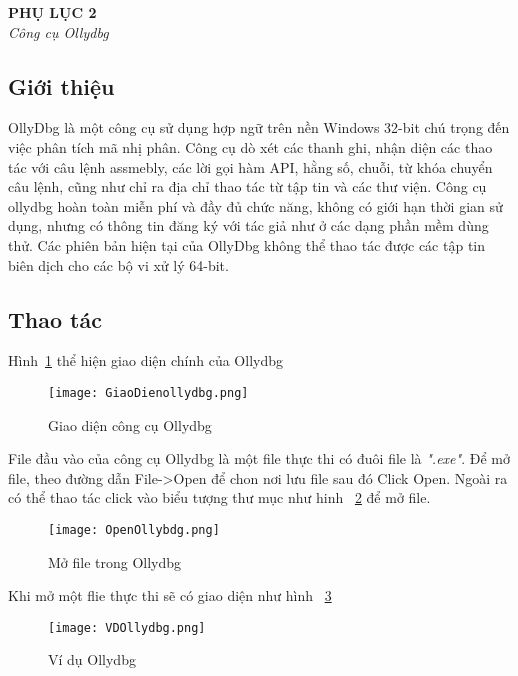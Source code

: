 \begin{center}
	\begin{huge}
			\textbf{PHỤ LỤC 2}\\
			\textit{Công cụ Ollydbg}
	\end{huge}
\end{center}

\subsection*{Giới thiệu}
	OllyDbg là một công cụ sử dụng hợp ngữ trên nền Windows 32-bit chú trọng đến việc phân tích mã nhị phân. Công cụ dò xét các thanh ghi, nhận diện các thao tác với câu lệnh assmebly, các lời gọi hàm API, hằng số, chuỗi, từ khóa chuyển câu lệnh, cũng như chỉ ra địa chỉ thao tác từ tập tin và các thư viện. Công cụ ollydbg hoàn toàn miễn phí và đầy đủ chức năng, không có giới hạn thời gian sử dụng, nhưng có thông tin đăng ký với tác giả như ở các dạng phần mềm dùng thử. Các phiên bản hiện tại của OllyDbg không thể thao tác được các tập tin biên dịch cho các bộ vi xử lý 64-bit.
\subsection*{Thao tác}
Hình~\ref{fig:GiaoDienOllydbg} thể hiện giao diện chính của Ollydbg
	\begin{center}
			\begin{figure}[htp]
				\begin{center}
					\texttt{[image: GiaoDienollydbg.png]}
				\end{center}
				\caption{Giao diện công cụ Ollydbg}	
					\label{fig:GiaoDienOllydbg}		
			\end{figure}
		\end{center}		

File đầu vào của công cụ Ollydbg là một file thực thi có đuôi file là \textit{".exe"}. Để mở file, theo đường dẫn File->Open để chon nơi lưu file sau đó Click Open. Ngoài ra có thể thao tác click vào biểu tượng thư mục như hinh ~\ref{fig:OpenOllydbg} để mở file.
		\begin{center}
			\begin{figure}[htp]
				\begin{center}
					\texttt{[image: OpenOllybdg.png]}
				\end{center}
				\caption{Mở file trong Ollydbg}	
					\label{fig:OpenOllydbg}		
			\end{figure}
		\end{center}		
Khi mở một flie thực thi sẽ có giao diện như hình ~\ref{fig:VDOllydbg}
	\begin{center}
			\begin{figure}[htp]
				\begin{center}
					\texttt{[image: VDOllydbg.png]}
				\end{center}
				\caption{Ví dụ Ollydbg}	
					\label{fig:VDOllydbg}		
			\end{figure}
		\end{center}		
		
